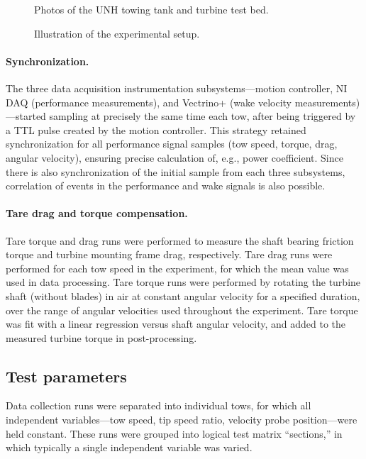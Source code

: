 \documentclass[10pt,letterpaper]{article}
\begin{document}
\begin{figure}[h]
\caption{Photos of the UNH towing tank and turbine test bed.} 
\label{fig:tow-tank}
\end{figure}

\begin{figure}[h]
\centering
\caption{Illustration of the experimental setup.}
\label{fig:exp-setup}
\end{figure}

\paragraph{Synchronization.} The three data acquisition instrumentation
subsystems---motion controller, NI DAQ (performance measurements), and Vectrino+
(wake velocity measurements)---started sampling at precisely the same time each
tow, after being triggered by a TTL pulse created by the motion controller. This
strategy retained synchronization for all performance signal samples (tow speed,
torque, drag, angular velocity), ensuring precise calculation of, e.g., power
coefficient. Since there is also synchronization of the initial sample from each
three subsystems, correlation of events in the performance and wake signals is
also possible.

\paragraph{Tare drag and torque compensation.} Tare torque and drag runs were
performed to measure the shaft bearing friction torque and turbine mounting
frame drag, respectively. Tare drag runs were performed for each tow speed in
the experiment, for which the mean value was used in data processing. Tare
torque runs were performed by rotating the turbine shaft (without blades) in air
at constant angular velocity for a specified duration, over the range of angular
velocities used throughout the experiment. Tare torque was fit with a linear
regression versus shaft angular velocity, and added to the measured turbine
torque in post-processing.


\subsection*{Test parameters}

Data collection runs were separated into individual tows, for which all
independent variables---tow speed, tip speed ratio, velocity probe
position---were held constant. These runs were grouped into logical test matrix
``sections,'' in which typically a single independent variable was varied.
\end{document}
